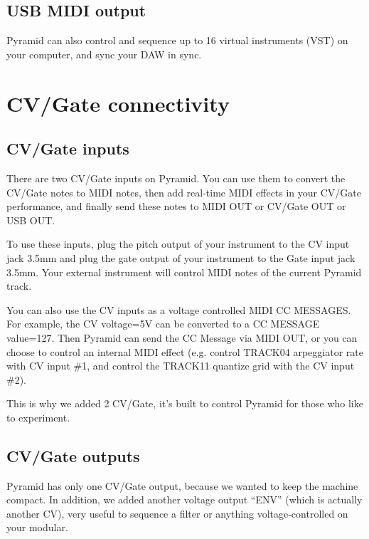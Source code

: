 \subsection{USB MIDI output}


Pyramid can also control and sequence up to 16 virtual instruments (VST) on your computer, and sync your DAW in sync.


\section{CV/Gate connectivity}

\subsection{CV/Gate inputs}


There are two CV/Gate inputs on Pyramid. You can use them to convert the CV/Gate notes to MIDI notes, then add real-time MIDI effects in your CV/Gate performance, and finally send these notes to MIDI OUT or CV/Gate OUT or USB OUT.

To use these inputs, plug the pitch output of your instrument to the CV input jack 3.5mm and plug the gate output of your instrument to the Gate input jack 3.5mm. Your external instrument will control MIDI notes of the current Pyramid track.

You can also use the CV inputs as a voltage controlled MIDI CC MESSAGES. For example, the CV voltage=5V can be converted to a CC MESSAGE value=127. Then Pyramid can send the CC Message via MIDI OUT, or you can choose to control an internal MIDI effect (e.g. control TRACK04 arpeggiator rate with CV input \#1, and control the TRACK11 quantize grid with the CV input \#2).

This is why we added 2 CV/Gate, it's built to control Pyramid for those who like to experiment.

\subsection{CV/Gate outputs}


Pyramid has only one CV/Gate output, because we wanted to keep the machine compact. In addition, we added another voltage output ``ENV'' (which is actually another CV), very useful to sequence a filter or anything voltage-controlled on your modular.


